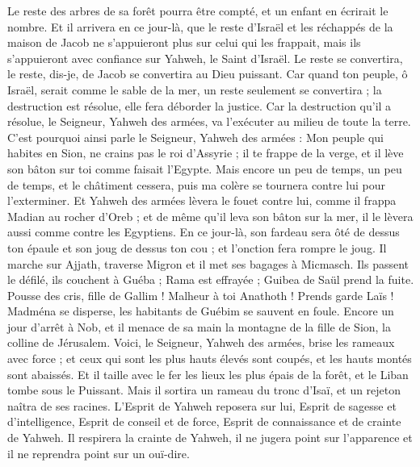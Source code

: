 \begin{multicols}{2}
Le reste des arbres de sa forêt pourra être compté, et un enfant en écrirait le nombre.
Et il arrivera en ce jour-là, que le reste d'Israël et les réchappés de la maison de Jacob ne s'appuieront plus sur celui qui les frappait, mais ils s'appuieront avec confiance sur Yahweh, le Saint d'Israël.
Le reste se convertira, le reste, dis-je, de Jacob se convertira au Dieu puissant.
Car quand ton peuple, ô Israël, serait comme le sable de la mer, un reste seulement se convertira ; la destruction est résolue, elle fera déborder la justice.
Car la destruction qu'il a résolue, le Seigneur, Yahweh des armées, va l'exécuter au milieu de toute la terre.
C'est pourquoi ainsi parle le Seigneur, Yahweh des armées : Mon peuple qui habites en Sion, ne crains pas le roi d'Assyrie ; il te frappe de la verge, et il lève son bâton sur toi comme faisait l'Egypte.
Mais encore un peu de temps, un peu de temps, et le châtiment cessera, puis ma colère se tournera contre lui pour l'exterminer.
Et Yahweh des armées lèvera le fouet contre lui, comme il frappa Madian au rocher d'Oreb ; et de même qu'il leva son bâton sur la mer, il le lèvera aussi comme contre les Egyptiens.
En ce jour-là, son fardeau sera ôté de dessus ton épaule et son joug de dessus ton cou ; et l'onction fera rompre le joug.
Il marche sur Ajjath, traverse Migron et il met ses bagages à Micmasch.
Ils passent le défilé, ils couchent à Guéba ; Rama est effrayée ; Guibea de Saül prend la fuite.
Pousse des cris, fille de Gallim ! Malheur à toi Anathoth ! Prends garde Laïs !
Madména se disperse, les habitants de Guébim se sauvent en foule.
Encore un jour d'arrêt à Nob, et il menace de sa main la montagne de la fille de Sion, la colline de Jérusalem.
Voici, le Seigneur, Yahweh des armées, brise les rameaux avec force ; et ceux qui sont les plus hauts élevés sont coupés, et les hauts montés sont abaissés.
Et il taille avec le fer les lieux les plus épais de la forêt, et le Liban tombe sous le Puissant.
\VerseOne{}Mais il sortira un rameau du tronc d'Isaï, et un rejeton naîtra de ses racines.
L'Esprit de Yahweh reposera sur lui, Esprit de sagesse et d'intelligence, Esprit de conseil et de force, Esprit de connaissance et de crainte de Yahweh.
Il respirera la crainte de Yahweh, il ne jugera point sur l'apparence et il ne reprendra point sur un ouï-dire.

\end{multicols}
